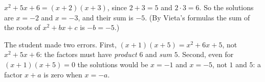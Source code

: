 $x^2+5x+6=(x+2)(x+3)$, since $2+3=5$ and $2\cdot3=6$. So the solutions are $x=-2$ and $x=-3$, and their sum is $\boxed{-5}$. (By Vieta's formulas the sum of the roots of $x^2+bx+c$ is $-b=-5$.)

The student made two errors. First, $(x+1)(x+5)=x^2+6x+5$, not $x^2+5x+6$: the factors must have \emph{product} $6$ and \emph{sum} $5$. Second, even for $(x+1)(x+5)=0$ the solutions would be $x=-1$ and $x=-5$, not $1$ and $5$: a factor $x+a$ is zero when $x=-a$.
